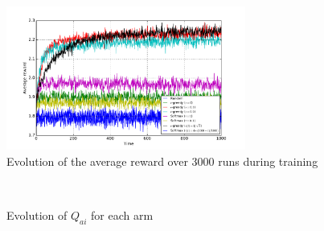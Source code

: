 \documentclass[a4paper]{article}
\begin{document}
\begin{figure}[H]
	\centering
	\includegraphics[width=0.7\textwidth]{./fig/ex1-3.pdf}
	\caption{Evolution of the average reward over 3000 runs during training}
	\label{ex13perf}
\end{figure}
\begin{figure}[H]
	\centering
	\\
	\caption{Evolution of $Q_{ai}$ for each arm}
	\label{ex13q}
\end{figure}
\end{document}
